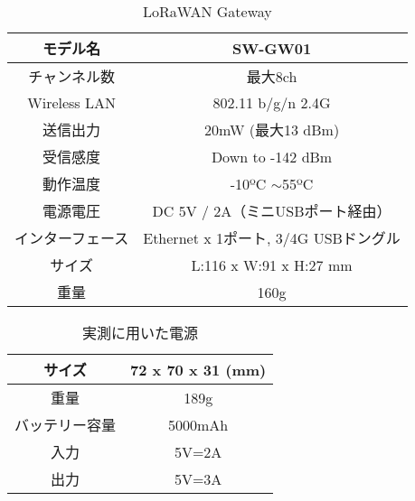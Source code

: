 \begin{table}[]
    \caption{LoRaWAN Gateway}\label{fig:LoRaWAN_Gateway_Spec}
    \centering
    \begin{tabular}{|c|c|}
    \hline
    モデル名         & SW-GW01                       \\ \hline
    チャンネル数       & 最大8ch                         \\ \hline
    Wireless LAN & 802.11 b/g/n 2.4G             \\ \hline
    送信出力         & 20mW (最大13 dBm)               \\ \hline
    受信感度         & Down to -142 dBm              \\ \hline
    動作温度         & -10ºC $\sim$55ºC              \\ \hline
    電源電圧         & DC 5V / 2A（ミニUSBポート経由）        \\ \hline
    インターフェース     & Ethernet x 1ポート, 3/4G USBドングル \\ \hline
    サイズ          & L:116 x W:91 x H:27 mm        \\ \hline
    重量           & 160g                          \\ \hline
    \end{tabular}
\end{table}

\begin{table}[]
    \caption{実測に用いた電源}\label{fig:LoRaWAN_Battery}
    \centering
    \begin{tabular}{|c|c|}
    \hline
    サイズ     & 72 x 70 x 31 (mm) \\ \hline
    重量      & 189g              \\ \hline
    バッテリー容量 & 5000mAh           \\ \hline
    入力      & 5V=2A             \\ \hline
    出力      & 5V=3A             \\ \hline
    \end{tabular}
\end{table}
